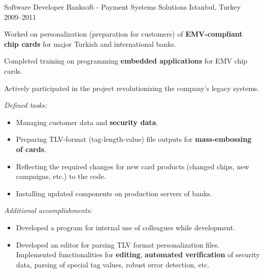 

\begin{cventries}

  \cventry
    {Software Developer} %
    {Banksoft - Payment Systems Solutions} %
    {Istanbul, Turkey} %
    {2009--2011} %
    {
      \begin{cvitems} %
        \item {Worked on personalization (preparation for customers) of \textbf{EMV-compliant chip cards} for major Turkish and international banks.}
        \item {Completed training on programming \textbf{embedded applications} for EMV chip cards.}
        \item {Actively participated in the project revolutionizing the company's legacy systems.}
        \item {\textit{Defined tasks:}}
        \begin{itemize}
            \item Managing customer data and \textbf{security data}.
            \item Preparing TLV-format (tag-length-value) file outputs for \textbf{mass-embossing of cards}.
            \item Reflecting the required changes for new card products (changed chips, new campaigns, etc.) to the code.
            \item Installing updated components on production servers of banks.
        \end{itemize}
        \item {\textit{Additional accomplishments:}}
        \begin{itemize}
            \item Developed a program for internal use of colleagues while development.
            \item Developed an editor for parsing TLV format personalization files. Implemented functionalities for \textbf{editing}, \textbf{automated verification} of security data, parsing of special tag values, robust error detection, etc.
        \end{itemize}
      \end{cvitems}
    }


\end{cventries}
